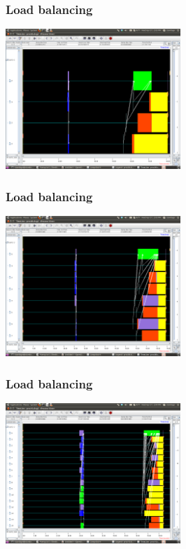 \documentclass{beamer}
\begin{document}
\begin{frame}
  \frametitle{Load balancing}
  \begin{center}
    \includegraphics[height=200px]{proc04-hg.png}
  \end{center}
\end{frame}
\begin{frame}
  \frametitle{Load balancing}
  \begin{center}
    \includegraphics[height=200px]{proc08-hg.png}
  \end{center}
\end{frame}
\begin{frame}
  \frametitle{Load balancing}
  \begin{center}
    \includegraphics[height=200px]{proc16-hg.png}
  \end{center}
\end{frame}
\end{document}
